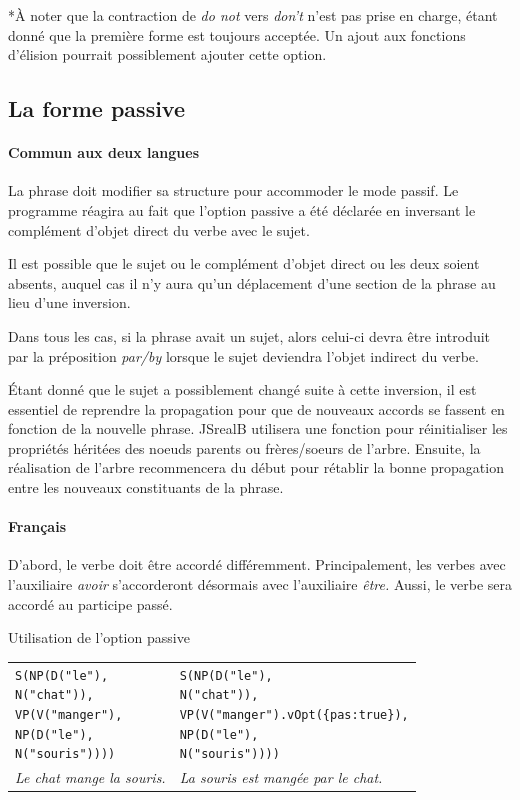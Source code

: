 \documentclass[11pt]{article} %
\newcommand{\system}[1]{\textsf{#1}}
\newcommand{\JSB}{\system{JSrealB}}
\newcommand{\real}[1]{\emph{#1}}
\begin{document}
{*}À noter que la contraction de \emph{do not }vers \emph{don't} n'est
pas prise en charge, étant donné que la première forme est toujours
acceptée. Un ajout aux fonctions d'élision pourrait possiblement ajouter
cette option.

\subsection{La forme passive}

\paragraph{Commun aux deux langues}

La phrase doit  modifier sa
structure pour accommoder le mode passif. Le programme réagira au
fait que l'option passive a été déclarée en inversant le complément
d'objet direct du verbe avec le sujet. 

Il est possible que le sujet ou le complément d'objet direct ou les deux soient absents, auquel cas
il n'y aura qu'un déplacement d'une section de la phrase au lieu d'une
inversion. 

Dans tous les cas, si la phrase avait un sujet, alors celui-ci devra être 
introduit par la préposition \real{par/by} lorsque le sujet deviendra  l'objet indirect du verbe.

Étant donné que le sujet a possiblement changé suite à
cette inversion, il est essentiel de reprendre la propagation
pour que de nouveaux accords se fassent en fonction de la nouvelle
phrase. \JSB{} utilisera une fonction pour réinitialiser les propriétés
héritées des noeuds parents ou frères/soeurs de l'arbre. Ensuite,
la réalisation de l'arbre recommencera du début pour rétablir la bonne
propagation entre les nouveaux constituants de la phrase.

\paragraph{Français}
D'abord, le verbe doit être accordé différemment. Principalement,
les verbes avec l'auxiliaire \emph{avoir} s'accorderont désormais
avec l'auxiliaire \emph{être.} Aussi, le verbe sera accordé au participe
passé.

\begin{example}
\caption{Utilisation de l'option passive}
\begin{tabular}{p{7cm} p{7cm}}
\begin{alltt}
S(NP(D("le"),
     N("chat")),
  VP(V("manger"),
     NP(D("le"),
        N("souris"))))
\end{alltt} &
\begin{alltt}
S(NP(D("le"),
     N("chat")),
  VP(V("manger").vOpt(\{pas:true\}),
     NP(D("le"),
        N("souris"))))
\end{alltt}
\\
\real{Le chat mange la souris.} & \real{La souris est mangée par le chat.}
\end{tabular}
\label{passif}
\end{example}
\end{document}
